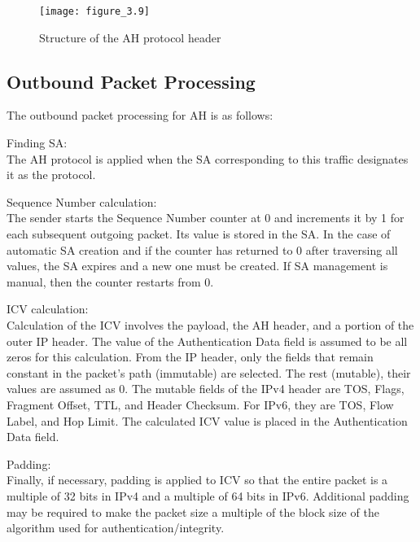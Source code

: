 \begin{figure}[H]
\centering
\texttt{[image: figure\_3.9]}\\
\caption{ Structure of the AH protocol header }
\label{fig:figure3.9}
\end{figure}

\subsection{Outbound Packet Processing}
The outbound packet processing for AH is as follows:
\begin{outline}[enumerate]
\1 Finding SA: \\The AH protocol is applied when the SA corresponding to this traffic designates it as the protocol.

\1 Sequence Number calculation:\\ The sender starts the Sequence Number counter at 0 and increments it by 1 for each subsequent outgoing packet. Its value is stored in the SA. In the case of automatic SA creation and if the counter has returned to 0 after traversing all values, the SA expires and a new one must be created. If SA management is manual, then the counter restarts from 0.

\1 ICV calculation: \\Calculation of the ICV involves the payload, the AH header, and a portion of the outer IP header. The value of the Authentication Data field is assumed to be all zeros for this calculation. From the IP header, only the fields that remain constant in the packet's path (immutable) are selected. The rest (mutable), their values are assumed as 0. The mutable fields of the IPv4 header are TOS, Flags, Fragment Offset, TTL, and Header Checksum. For IPv6, they are TOS, Flow Label, and Hop Limit. The calculated ICV value is placed in the Authentication Data field.

\1 Padding: \\Finally, if necessary, padding is applied to ICV so that the entire packet is a multiple of 32 bits in IPv4 and a multiple of 64 bits in IPv6. Additional padding may be required to make the packet size a multiple of the block size of the algorithm used for authentication/integrity.
\end{outline}

